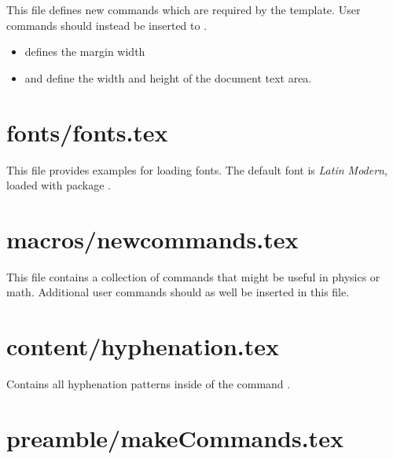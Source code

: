 This file defines new commands which are required by the template. User commands should instead be inserted to .

\begin{itemize}
\item {} defines the margin width
\item {} and  define the width and height of the document text area.
\end{itemize}


\section{fonts/fonts.tex}

This file provides examples for loading fonts. The default font is \emph{Latin Modern}, loaded with package . 



\section{macros/newcommands.tex}

This file contains a collection of commands that might be useful in physics or math. Additional user commands should as well be inserted in this file.


\section{content/hyphenation.tex}

Contains all hyphenation patterns inside of the command .


\section{preamble/makeCommands.tex}

